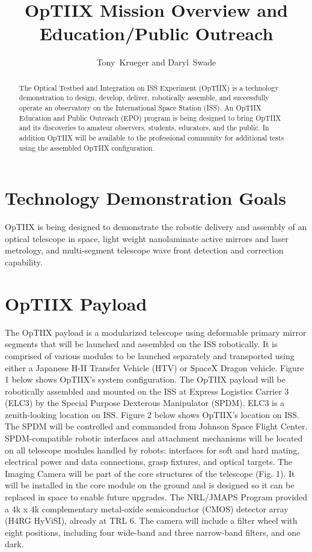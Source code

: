 
\resetcounters




\title{OpTIIX Mission Overview and Education/Public Outreach}
\author{Tony~Krueger and Daryl~Swade
}

\begin{abstract}
The Optical Testbed and Integration on ISS Experiment (OpTIIX) is a technology demonstration to design, develop, deliver, robotically assemble, and successfully operate an observatory on the International Space Station (ISS).  An OpTIIX Education and Public Outreach (EPO) program is being designed to bring OpTIIX and its discoveries to amateur observers, students, educators, and the public.  In addition OpTIIX will be available to the professional community for additional tests using the assembled OpTIIX configuration. 
\end{abstract}

\section{Technology Demonstration Goals}
OpTIIX is being designed to demonstrate the robotic delivery and assembly of an optical telescope in space, light weight nanolaminate active mirrors and laser metrology, and multi-segment telescope wave front detection and correction capability.

\section{OpTIIX Payload}
The OpTIIX payload is a modularized telescope using deformable primary mirror segments that will be launched and assembled on the ISS robotically.  It is comprised of various modules to be launched separately and transported using either a Japanese H-II Transfer Vehicle (HTV) or SpaceX Dragon vehicle.  Figure 1 below shows OpTIIX’s system configuration.  The OpTIIX payload will be robotically assembled and mounted on the ISS at Express Logistics Carrier 3 (ELC3) by the Special Purpose Dexterous Manipulator (SPDM).  ELC3 is a zenith-looking location on ISS.  Figure 2 below shows OpTIIX’s location on ISS. The SPDM will be controlled and commanded from Johnson Space Flight Center. SPDM-compatible robotic interfaces and attachment mechanisms will be located on all telescope modules handled by robots: interfaces for soft and hard mating, electrical power and data connections, grasp fixtures, and optical targets.  The Imaging Camera will be part of the core structures of the telescope (Fig. 1). It will be installed in the core module on the ground and is designed so it can be replaced in space to enable future upgrades. The NRL/JMAPS Program provided a 4k x 4k complementary metal-oxide semiconductor (CMOS) detector array (H4RG HyViSI), already at TRL 6. The camera will include a filter wheel with eight positions, including four wide-band and three narrow-band filters, and one dark.

